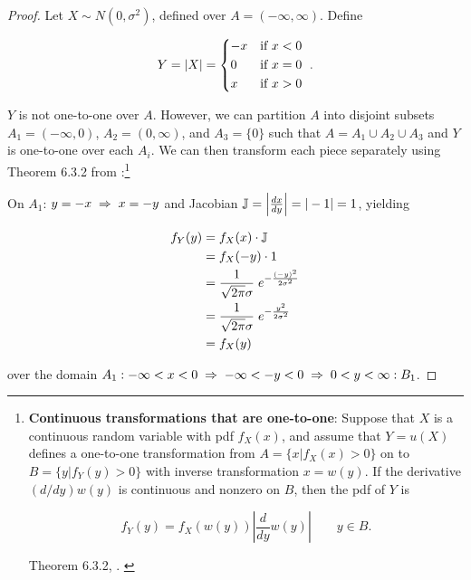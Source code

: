 \documentclass{article}
\begin{document}
\begin{proof}
  Let $X \sim N(0, \sigma^2)$, defined over $A = (-\infty, \infty)$. Define 
  
  \begin{equation*}
    Y = |X| =
    \begin{dcases*}
      -x & if $x < 0$ \\
      0 & if $x = 0$ \\
      x & if $x > 0$ \\
    \end{dcases*}
    .
  \end{equation*}

  $Y$ is not one-to-one over $A$. However, we can partition $A$ into disjoint
  subsets $A_1 = (-\infty, 0)$, $A_2 = (0, \infty)$, and $A_3 = \{0\}$ such
  that $A = A_1 \cup A_2 \cup A_3$ and $Y$ is one-to-one over each $A_i$. We
  can then transform each piece separately using Theorem 6.3.2 from
  \citet{textbook}:\footnote{\textbf{Continuous transformations that are
  one-to-one}: Suppose that $X$ is a continuous random variable with pdf
  $f_X(x)$, and assume that $Y = u(X)$ defines a one-to-one transformation from
  $A = \{x|f_X(x) > 0\}$ on to $B = \{y|f_Y(y) > 0\}$ with inverse
  transformation $x = w(y)$. If the derivative $(d/dy)w(y)$ is continuous and
  nonzero on $B$, then the pdf of $Y$ is

  \begin{equation}
    \label{eq:transformations-1-to-1}
    f_Y(y) = f_X(w(y)) \left| \frac{d}{dy} w(y) \right| \qquad y \in B.
  \end{equation}

  Theorem 6.3.2, \citet{textbook}.
  \label{fnote:transformations-1-to-1}
  }

  On $A_1$: $y = -x \;\Rightarrow\; x = -y$ and Jacobian $\mathbb{J} = \left| \frac{dx}{dy} \right|
  = |-1| = 1$, yielding

  \begin{align*}
    f_Y(y) &= f_X(x) \cdot \mathbb{J} \\
    &= f_X(-y) \cdot 1 \\
    &= \frac{1}{\sqrt{2\pi}\sigma} \; e^{-\frac{(-y)^2}{2\sigma^2}} \\
    &= \frac{1}{\sqrt{2\pi}\sigma} \; e^{-\frac{y^2}{2\sigma^2}} \\
    &= f_X(y)
  \end{align*}

  over the domain $A_1: -\infty < x < 0 \;\Rightarrow\; -\infty < -y < 0 \;\Rightarrow\; 0 < y < \infty :B_1$.


\end{proof}
\end{document}
